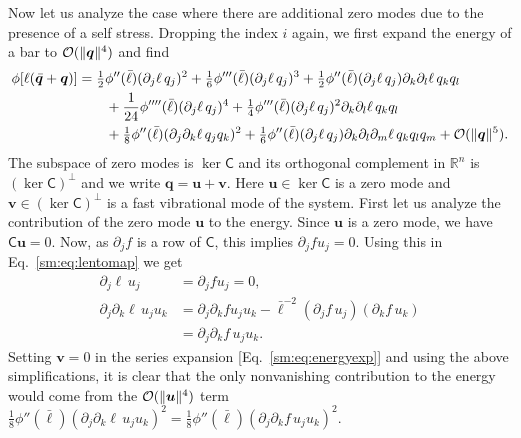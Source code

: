 Now let us analyze the case where there are additional zero modes due to the presence of a self stress.
Dropping the index $i$ again, we first expand the energy of a bar to $\mathcal{O}(\lVert\bm{q}\rVert^4)$ and find
%
\begin{equation}
  \begin{aligned}
    \phi[\ell(\bar{\bm{q}} + \bm{q})] &=
    \tfrac{1}{2}\phi''(\bar{\ell})(\partial_j \ell\,q_j)^2 +
    \tfrac{1}{6}\phi'''(\bar{\ell})(\partial_j \ell\,q_j)^3 +
    \tfrac{1}{2}\phi''(\bar{\ell})(\partial_j \ell\,q_j)\partial_k\partial_l \ell\, q_k q_l\\ &\qquad+
    \frac{1}{24}\phi''''(\bar{\ell})(\partial_j \ell\,q_j)^4 +
    \tfrac{1}{4}\phi'''(\bar{\ell})(\partial_j \ell\,q_j)^2 \partial_k \partial_l \ell\, q_k q_l\\ &\qquad+
    \tfrac{1}{8}\phi''(\bar{\ell})(\partial_j\partial_k \ell\, q_j q_k)^2 +
    \tfrac{1}{6}\phi''(\bar{\ell})(\partial_j \ell\, q_j)\partial_k\partial_l\partial_m \ell\, q_k q_l q_m + \mathcal{O}(\lVert\bm{q}\rVert^5).
  \end{aligned}
  \label{sm:eq:energyexp}
\end{equation}
%
The subspace of zero modes is $\ker\mathsf{C}$ and its orthogonal complement in $\mathbb{R}^n$ is $(\ker\mathsf{C})^\perp$ and we write $\bm{q} = \bm{u} + \bm{v}$.
Here $\bm{u} \in \ker\mathsf{C}$ is a zero mode and $\bm{v} \in (\ker\mathsf{C})^{\perp}$ is a fast vibrational mode of the system.
First let us analyze the contribution of the zero mode $\bm{u}$ to the energy.
Since $\bm{u}$ is a zero mode, we have $\mathsf{C}\bm{u} = 0$.
Now, as $\partial_j f$ is a row of $\mathsf{C}$, this implies $\partial_j f u_j = 0$.
Using this in Eq.~\eqref{sm:eq:lentomap} we get
%
\begin{equation}
  \begin{aligned}
    \partial_j \ell\,u_j &= \partial_j f u_j=0,\\
    \partial_j \partial_k \ell\, u_j u_k
                        &= \partial_j\partial_k f u_j u_k - \bar{\ell}^{-2}(\partial_j f\, u_j) (\partial_k f\, u_k)\\
                        &= \partial_j\partial_k f\, u_j u_k.
  \end{aligned}
\end{equation}
%
Setting $\bm{v} = 0$ in the series expansion [Eq.~\eqref{sm:eq:energyexp}] and using the above simplifications, it is clear that the only nonvanishing contribution to the energy would come from the $\mathcal{O}(\lVert\bm{u}\rVert^4)$ term $\tfrac{1}{8}{\phi''(\bar{\ell})}(\partial_j \partial_k \ell\, u_j u_k)^2 = \tfrac{1}{8}{\phi''(\bar{\ell})}(\partial_j \partial_k f\, u_j u_k)^2$.

